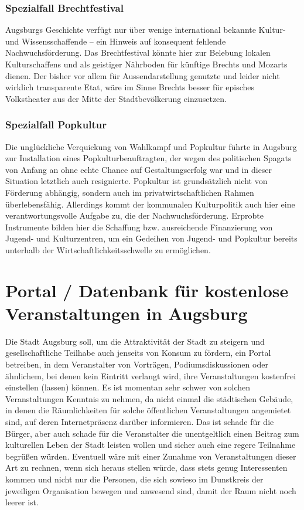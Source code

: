   \subsubsection{Spezialfall Brechtfestival}
  
  Augsburgs Geschichte verfügt nur über wenige international bekannte Kultur- 
  und Wissensschaffende – ein Hinweis auf konsequent fehlende 
  Nachwuchsförderung. Das Brechtfestival könnte hier zur Belebung lokalen 
  Kulturschaffens und als geistiger Nährboden für künftige Brechts und 
  Mozarts dienen. Der bisher vor allem für Aussendarstellung genutzte und 
  leider nicht wirklich transparente Etat, wäre im Sinne Brechts besser für 
  episches Volkstheater aus der Mitte der Stadtbevölkerung einzusetzen.
  
  \subsubsection{Spezialfall Popkultur}
  
  Die unglückliche Verquickung von Wahlkampf und Popkultur führte in Augsburg 
  zur Installation eines Popkulturbeauftragten, der wegen des politischen 
  Spagats von Anfang an ohne echte Chance auf Gestaltungserfolg war und in 
  dieser Situation letztlich auch resignierte. Popkultur ist grundsätzlich 
  nicht von Förderung abhängig, sondern auch im privatwirtschaftlichen Rahmen 
  überlebensfähig. Allerdings kommt der kommunalen Kulturpolitik auch hier 
  eine verantwortungsvolle Aufgabe zu, die der Nachwuchsförderung. Erprobte 
  Instrumente bilden hier die Schaffung bzw. ausreichende Finanzierung von 
  Jugend- und Kulturzentren, um ein Gedeihen von Jugend- und Popkultur 
  bereits unterhalb der Wirtschaftlichkeitsschwelle zu ermöglichen. 
  
  \section{Portal / Datenbank für kostenlose Veranstaltungen in Augsburg}
  
  Die Stadt Augsburg soll, um die Attraktivität der Stadt zu steigern und 
  gesellschaftliche Teilhabe auch jenseits von Konsum zu fördern, ein Portal 
  betreiben, in dem Veranstalter von Vorträgen, Podiumsdiskussionen oder 
  ähnlichem, bei denen kein Eintritt verlangt wird, ihre Veranstaltungen 
  kostenfrei einstellen (lassen) können. Es ist momentan sehr schwer von 
  solchen Veranstaltungen Kenntnis zu nehmen, da nicht einmal die städtischen 
  Gebäude, in denen die Räumlichkeiten für solche öffentlichen 
  Veranstaltungen angemietet sind, auf deren Internetpräsenz darüber 
  informieren. Das ist schade für die Bürger, aber auch schade für die 
  Veranstalter die unentgeltlich einen Beitrag zum kulturellen Leben der 
  Stadt leisten wollen und sicher auch eine regere Teilnahme begrüßen würden. 
  Eventuell wäre mit einer Zunahme von Veranstaltungen dieser Art zu rechnen, 
  wenn sich heraus stellen würde, dass stets genug Interessenten kommen und 
  nicht nur die Personen, die sich sowieso im Dunstkreis der jeweiligen 
  Organisation bewegen und anwesend sind, damit der Raum nicht noch leerer ist. 
